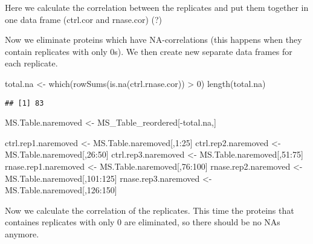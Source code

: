 \documentclass[
]{article}
\newenvironment{Shaded}{\begin{snugshade}}{\end{snugshade}}
\newcommand{\DecValTok}[1]{\textcolor[rgb]{0.00,0.00,0.81}{#1}}
\newcommand{\FunctionTok}[1]{\textcolor[rgb]{0.00,0.00,0.00}{#1}}
\newcommand{\NormalTok}[1]{#1}
\newcommand{\OtherTok}[1]{\textcolor[rgb]{0.56,0.35,0.01}{#1}}
\newcommand{\SpecialCharTok}[1]{\textcolor[rgb]{0.00,0.00,0.00}{#1}}
\begin{document}
Here we calculate the correlation between the replicates and put them
together in one data frame (ctrl.cor and rnase.cor) (?)

Now we eliminate proteins which have NA-correlations (this happens when
they contain replicates with only 0s). We then create new separate data
frames for each replicate.

\begin{Shaded}
\begin{Highlighting}[]
\NormalTok{total.na }\OtherTok{\textless{}{-}} \FunctionTok{which}\NormalTok{(}\FunctionTok{rowSums}\NormalTok{(}\FunctionTok{is.na}\NormalTok{(ctrl.rnase.cor)) }\SpecialCharTok{\textgreater{}} \DecValTok{0}\NormalTok{)}
\FunctionTok{length}\NormalTok{(total.na)}
\end{Highlighting}
\end{Shaded}

\begin{verbatim}
## [1] 83
\end{verbatim}

\begin{Shaded}
\begin{Highlighting}[]
\NormalTok{MS.Table.naremoved }\OtherTok{\textless{}{-}}\NormalTok{ MS\_Table\_reordered[}\SpecialCharTok{{-}}\NormalTok{total.na,]}

\NormalTok{ctrl.rep1.naremoved }\OtherTok{\textless{}{-}}\NormalTok{ MS.Table.naremoved[,}\DecValTok{1}\SpecialCharTok{:}\DecValTok{25}\NormalTok{]}
\NormalTok{ctrl.rep2.naremoved }\OtherTok{\textless{}{-}}\NormalTok{ MS.Table.naremoved[,}\DecValTok{26}\SpecialCharTok{:}\DecValTok{50}\NormalTok{]}
\NormalTok{ctrl.rep3.naremoved }\OtherTok{\textless{}{-}}\NormalTok{ MS.Table.naremoved[,}\DecValTok{51}\SpecialCharTok{:}\DecValTok{75}\NormalTok{]}
\NormalTok{rnase.rep1.naremoved }\OtherTok{\textless{}{-}}\NormalTok{ MS.Table.naremoved[,}\DecValTok{76}\SpecialCharTok{:}\DecValTok{100}\NormalTok{]}
\NormalTok{rnase.rep2.naremoved }\OtherTok{\textless{}{-}}\NormalTok{ MS.Table.naremoved[,}\DecValTok{101}\SpecialCharTok{:}\DecValTok{125}\NormalTok{]}
\NormalTok{rnase.rep3.naremoved }\OtherTok{\textless{}{-}}\NormalTok{ MS.Table.naremoved[,}\DecValTok{126}\SpecialCharTok{:}\DecValTok{150}\NormalTok{]}
\end{Highlighting}
\end{Shaded}

Now we calculate the correlation of the replicates. This time the
proteins that containes replicates with only 0 are eliminated, so there
should be no NAs anymore.
\end{document}

